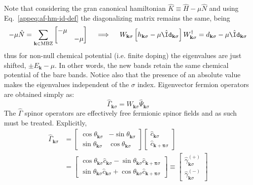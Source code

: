 Note that considering the gran canonical hamiltonian $\hat K \equiv \hat H - \mu\hat N$ and using Eq.~\eqref{appeq:af-hm-id-def} the diagonalizing matrix remains the same, being
\begin{equation}\label{appeq:af-full-h-diagonalization}
	-\mu\hat N = \sum_{\mathbf{k}\in\mathrm{MBZ}} \begin{bmatrix}
		-\mu & \\ & -\mu
	\end{bmatrix}
	\quad\implies\quad
	W_{\mathbf{k}\sigma} \left[ 
	h_{\mathbf{k}\sigma}-\mu \hat \Id_{\mathbf{k}\sigma}
	\right] W_{\mathbf{k}\sigma}^\dagger = d_{\mathbf{k}\sigma}-\mu \hat \Id_{\mathbf{k}\sigma}
\end{equation}
thus for non-null chemical potential (i.e. finite doping) the eigenvalues are just shifted, $\pm E_\mathbf{k}-\mu$. In other words, the new bands retain the same chemical potential of the bare bands. Notice also that the presence of an absolute value makes the eigenvalues independent of the $\sigma$ index. Eigenvector fermion operators are obtained simply as:
\begin{equation}\label{appeq:af-diagonalized-nambu-spinor}
	\hat\Gamma_{\mathbf{k}\sigma} = W_{\mathbf{k}\sigma} \hat \Psi_{\mathbf{k}\sigma}
\end{equation}
The $\hat\Gamma$ spinor operators are effectively free fermionic spinor fields and as such must be treated. Explicitly,
\begin{align}
	\hat\Gamma_{\mathbf{k}\sigma} &= \begin{bmatrix}
		\cos \theta_{\mathbf{k}\sigma} & - \sin \theta_{\mathbf{k}\sigma} \\
		\sin \theta_{\mathbf{k}\sigma} & \cos \theta_{\mathbf{k}\sigma}
	\end{bmatrix} \begin{bmatrix}
		\hat c_{\mathbf{k}\sigma} \\
		\hat c_{\mathbf{k}+\bm{\pi}\sigma} 
	\end{bmatrix} \nonumber \\
	&= \begin{bmatrix}
		\cos \theta_{\mathbf{k}\sigma} \hat c_{\mathbf{k}\sigma} - \sin \theta_{\mathbf{k}\sigma} \hat c_{\mathbf{k}+\bm{\pi}\sigma}  \\
		\sin \theta_{\mathbf{k}\sigma} \hat c_{\mathbf{k}\sigma} + \cos \theta_{\mathbf{k}\sigma} \hat c_{\mathbf{k}+\bm{\pi}\sigma} 
	\end{bmatrix} \equiv
	\begin{bmatrix}
		\hat \gamma_{\mathbf{k}\sigma}^{(+)} \\
		\hat \gamma_{\mathbf{k}\sigma}^{(-)} 
	\end{bmatrix} \label{appeq:af-hm-gamma-ops-transform}
\end{align}


